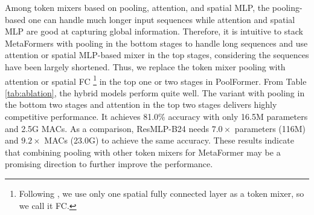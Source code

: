  Among token mixers based on pooling, attention, and spatial MLP, the pooling-based one can handle much longer input sequences while attention and spatial MLP are good at capturing global information. 
Therefore, it is intuitive to stack MetaFormers with pooling in the bottom stages to handle long sequences and use attention or spatial MLP-based mixer in the top stages, considering the sequences have been largely shortened. Thus, we replace the token mixer pooling with attention or spatial FC \footnote{Following \cite{resmlp}, we use only one spatial fully connected layer as a token mixer, so we call it FC.} in the top one or two stages in PoolFormer. From Table \ref{tab:ablation}, the hybrid models perform quite well. The variant with pooling in the bottom two stages and attention in the top two stages delivers highly competitive performance. 
It achieves 81.0\% accuracy with only 16.5M parameters and 2.5G MACs. 
As a comparison, ResMLP-B24 needs $7.0\times$ parameters (116M) and $9.2\times$ MACs (23.0G) to achieve the same accuracy. These results indicate that combining pooling with other token mixers for MetaFormer may be a promising direction to further improve the performance. 




